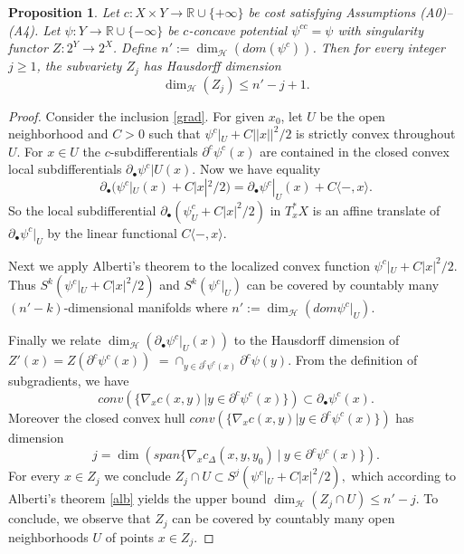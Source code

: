 \documentclass[12pt]{amsart}
\newtheorem{prop}{Proposition}
\theoremstyle{definition}
\theoremstyle{remark}
\newcommand{\bR}{\mathbb{R}}
\newcommand{\del}{\partial}
\newcommand{\cd}{c_\Delta}
\begin{document}

\begin{prop}
\label{sing-dim}
Let $c: X\times Y \to \bR \cup \{+\infty\}$ be cost satisfying Assumptions (A0)--(A4). Let $\psi: Y\to \bR \cup \{-\infty\}$ be $c$-concave potential $\psi^{cc}=\psi$ with singularity functor $Z: 2^Y \to 2^X$. Define $n':=\dim_{\mathscr{H}}(dom (\psi^c))$. Then for every integer $j\geq 1$, the subvariety $Z_j$ has Hausdorff dimension $$\dim_{\mathscr{H}} (Z_{j}) \leq n'-j+1.$$ 
\end{prop}
\begin{proof}

Consider the inclusion \eqref{grad}. For given $x_0$, let $U$ be the open neighborhood and $C>0$ such that $\psi^c |_{U} + C ||x||^2/2$ is strictly convex throughout $U$. For $x\in U$ the $c$-subdifferentials $\del^c \psi^c(x)$ are contained in the closed convex local subdifferentials  $\del_\bullet \psi^c|U(x)$. Now we have equality \begin{equation}\del_\bullet (\psi^c|_U(x) + C |x|^2/2) = \del_\bullet \psi^c|_U(x) + C \langle -, x\rangle \label{subadd}.\end{equation} So the local subdifferential $\del_\bullet (\psi^c_U + C |x|^2/2)$ in $T_x^* X$ is an affine translate of $\del_\bullet \psi^c|_U$ by the linear functional $C\langle - ,x\rangle$. 

Next we apply Alberti's theorem to the localized convex function $\psi^c|_U + C |x|^2/2$. Thus $S^k(\psi^c|_U + C|x|^2/2)$ and $S^k(\psi^c|_U)$ can be covered by countably many $(n'-k)$-dimensional manifolds where $n':=\dim_{\mathscr{H}}(dom \psi^c|_U)$.

Finally we relate $\dim_{\mathscr{H}} (\del_\bullet \psi^c|_U(x))$ to the Hausdorff dimension of $Z'(x)=Z(\del^c \psi^c(x))$ $=\cap_{y\in \del^c \psi^c (x)} \del^c \psi(y)$. From the definition of subgradients, we have $$conv(\{ \nabla_x c(x,y) | y\in \del^c \psi^c(x)\}) \subset \del_\bullet \psi^c(x).$$ Moreover the closed convex hull $conv(\{ \nabla_x c(x,y) | y\in \del^c \psi^c(x)\})$ has dimension $$j=\dim(span\{\nabla_x \cd(x,y,y_0)~|~ y\in \del^c \psi^c(x) \}).$$ For every $x\in Z_j$ we conclude $Z_j \cap U \subset S^j(\psi^c|_U + C |x|^2/2),$ which according to Alberti's theorem \ref{alb} yields the upper bound $ \dim_{\mathscr{H}}(Z_j \cap U) \leq n'-j.$ To conclude, we observe that $Z_j$ can be covered by countably many open neighborhoods $U$ of points $x\in Z_j$. 

\end{proof}
\end{document}
